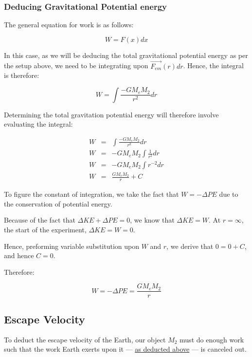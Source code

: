 \documentclass[letterpaper]{article}
\begin{document}
\subsubsection{Deducing Gravitational Potential energy}
\label{sec:orgcec6df7}

The general equation for work is as follows:

\begin{equation}
W = F(x) dx
\end{equation}

In this case, as we will be deducing the total gravitational potential energy as per the setup above, we need to be integrating upon \(\vec{F_{em}}(r) dr\). Hence, the integral is therefore:

\begin{equation}
W = \int{\frac{-GM_eM_2}{r^2} dr}
\end{equation}

Determining the total gravitation potential energy will therefore involve evaluating the integral:

\begin{eqnarray}
W &=& \int{\frac{-GM_eM_2}{r^2} dr} \\
W &=& -GM_eM_2 \int{\frac{1}{r^2} dr} \\
W &=& -GM_eM_2 \int{r^{-2} dr} \\
W &=& \frac{GM_eM_2}{r} + C
\end{eqnarray}

To figure the constant of integration, we take the fact that \(W=-\Delta PE\) due to the conservation of potential energy.

Because of the fact that \(\Delta KE + \Delta PE = 0\), we know that \(\Delta KE = W\). At \(r=\infty\), the start of the experiment, \(\Delta KE = W = 0\).

Hence, preforming variable substitution upon \(W\) and \(r\), we derive that \(0 = 0 + C\), and hence \(C=0\).

Therefore:

\begin{equation}
    W = -\Delta PE = \frac{GM_eM_2}{r} 
\end{equation}

\subsection{Escape Velocity}
\label{sec:org4285006}
To deduct the escape velocity of the Earth, our object \(M_2\) must do enough work such that the work Earth exerts upon it --- \hyperref[sec:orgcec6df7]{as deducted above} --- is canceled out.
\end{document}
